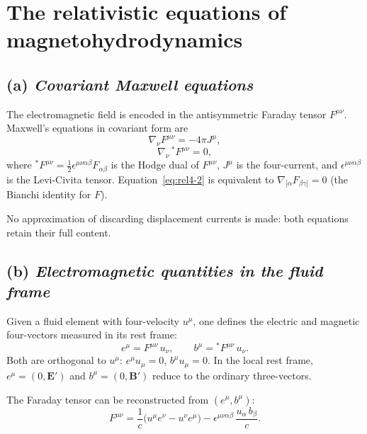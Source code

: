 \section{The relativistic equations of magnetohydrodynamics}\label{sec:rel37}

\subsection*{(a) \emph{Covariant Maxwell equations}}

The electromagnetic field is encoded in the antisymmetric Faraday tensor
$F^{\mu\nu}$.  Maxwell's equations in covariant form are
\begin{equation}\label{eq:rel4-1}
  \nabla_{\nu} F^{\mu\nu} = -4\pi J^{\mu},
\end{equation}
\begin{equation}\label{eq:rel4-2}
  \nabla_{\nu}\, {}^{*}\!F^{\mu\nu} = 0,
\end{equation}
where ${}^{*}\!F^{\mu\nu} = \tfrac{1}{2}\epsilon^{\mu\nu\alpha\beta}
F_{\alpha\beta}$ is the Hodge dual of $F^{\mu\nu}$, $J^{\mu}$ is the
four-current, and $\epsilon^{\mu\nu\alpha\beta}$ is the Levi-Civita
tensor.  Equation~\eqref{eq:rel4-2} is equivalent to
$\nabla_{[\alpha}F_{\beta\gamma]}=0$ (the Bianchi identity for $F$).

No approximation of discarding displacement currents is made: both
equations retain their full content.

\subsection*{(b) \emph{Electromagnetic quantities in the fluid frame}}

Given a fluid element with four-velocity $u^{\mu}$, one defines the
electric and magnetic four-vectors measured in its rest frame:
\begin{equation}\label{eq:rel4-3}
  e^{\mu} = F^{\mu\nu}\,u_{\nu},
  \qquad
  b^{\mu} = {}^{*}\!F^{\mu\nu}\,u_{\nu}.
\end{equation}
Both are orthogonal to $u^{\mu}$: $e^{\mu}u_{\mu}=0$, $b^{\mu}u_{\mu}=0$.
In the local rest frame, $e^{\mu}=(0,\mathbf{E}')$ and
$b^{\mu}=(0,\mathbf{B}')$ reduce to the ordinary three-vectors.

The Faraday tensor can be reconstructed from $(e^{\mu},b^{\mu})$:
\begin{equation}\label{eq:rel4-4}
  F^{\mu\nu} = \frac{1}{c}\bigl(u^{\mu}e^{\nu}-u^{\nu}e^{\mu}\bigr)
    - \epsilon^{\mu\nu\alpha\beta}\,\frac{u_{\alpha}\,b_{\beta}}{c}.
\end{equation}

